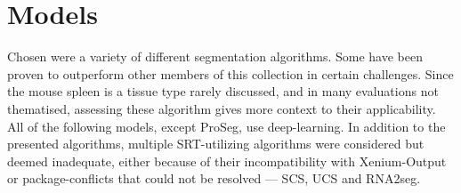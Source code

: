 \section*{Models}
Chosen were a variety of different segmentation algorithms. Some have been proven to outperform other members of this collection in certain challenges. Since the mouse spleen is a tissue type rarely discussed, and in many evaluations not thematised, assessing these algorithm gives more context to their applicability. \\
All of the following models, except ProSeg, use deep-learning. In addition to the presented algorithms, multiple SRT-utilizing algorithms were considered but deemed inadequate, either because of their incompatibility with Xenium-Output or package-conflicts that could not be resolved --- SCS, UCS and RNA2seg.\\
%







